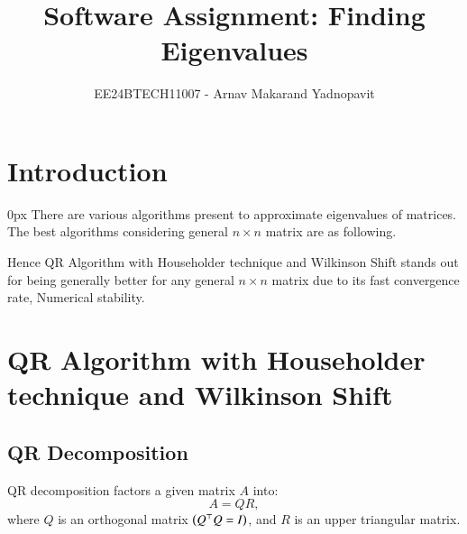 \documentclass[journal,12pt,onecolumn]{IEEEtran}
\theoremstyle{remark}
\begin{document}
\title{Software Assignment: Finding Eigenvalues}
\author{EE24BTECH11007 - Arnav Makarand Yadnopavit}
\maketitle
\renewcommand{\thefigure}{\theenumi}
\renewcommand{\thetable}{\theenumi}

\section{Introduction}
\parindent 0px There are various algorithms present to approximate eigenvalues of matrices. The best algorithms considering general $n\times n$ matrix are as following.\\

\begin{table}[h]
    \centering
    
\end{table}
Hence QR Algorithm with Householder technique and Wilkinson Shift stands out for being generally better for any general $n\times n$ matrix due to its fast convergence rate, Numerical stability.
\section{QR Algorithm with Householder technique and Wilkinson Shift}
\subsection{QR Decomposition}
QR decomposition factors a given matrix $A$ into:
$$A = QR,$$
where $Q$ is an orthogonal matrix $\left(Q^\top Q = I\right)$, and $R$ is an upper triangular matrix.
\end{document}
